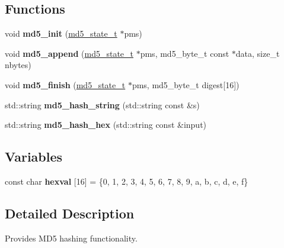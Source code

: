 \subsection*{Functions}
\begin{DoxyCompactItemize}
\item 
void {\bfseries md5\+\_\+init} (\hyperlink{structwebsocketpp_1_1md5_1_1md5__state__s}{md5\+\_\+state\+\_\+t} $\ast$pms)\hypertarget{namespacewebsocketpp_1_1md5_a73499ae9912f813cdbb98d27b6487112}{}\label{namespacewebsocketpp_1_1md5_a73499ae9912f813cdbb98d27b6487112}

\item 
void {\bfseries md5\+\_\+append} (\hyperlink{structwebsocketpp_1_1md5_1_1md5__state__s}{md5\+\_\+state\+\_\+t} $\ast$pms, md5\+\_\+byte\+\_\+t const $\ast$data, size\+\_\+t nbytes)\hypertarget{namespacewebsocketpp_1_1md5_afd827a71255e45a8293b9df13342ceb3}{}\label{namespacewebsocketpp_1_1md5_afd827a71255e45a8293b9df13342ceb3}

\item 
void {\bfseries md5\+\_\+finish} (\hyperlink{structwebsocketpp_1_1md5_1_1md5__state__s}{md5\+\_\+state\+\_\+t} $\ast$pms, md5\+\_\+byte\+\_\+t digest\mbox{[}16\mbox{]})\hypertarget{namespacewebsocketpp_1_1md5_a29e7adb892ae2de7d2c4853bc7ace034}{}\label{namespacewebsocketpp_1_1md5_a29e7adb892ae2de7d2c4853bc7ace034}

\item 
std\+::string {\bfseries md5\+\_\+hash\+\_\+string} (std\+::string const \&s)\hypertarget{namespacewebsocketpp_1_1md5_ab445cdc2367665afb8fd4e983a354e0f}{}\label{namespacewebsocketpp_1_1md5_ab445cdc2367665afb8fd4e983a354e0f}

\item 
std\+::string {\bfseries md5\+\_\+hash\+\_\+hex} (std\+::string const \&input)\hypertarget{namespacewebsocketpp_1_1md5_a9fbd05134b509739ff15175fe7104443}{}\label{namespacewebsocketpp_1_1md5_a9fbd05134b509739ff15175fe7104443}

\end{DoxyCompactItemize}
\subsection*{Variables}
\begin{DoxyCompactItemize}
\item 
const char {\bfseries hexval} \mbox{[}16\mbox{]} = \{\textquotesingle{}0\textquotesingle{}, \textquotesingle{}1\textquotesingle{}, \textquotesingle{}2\textquotesingle{}, \textquotesingle{}3\textquotesingle{}, \textquotesingle{}4\textquotesingle{}, \textquotesingle{}5\textquotesingle{}, \textquotesingle{}6\textquotesingle{}, \textquotesingle{}7\textquotesingle{}, \textquotesingle{}8\textquotesingle{}, \textquotesingle{}9\textquotesingle{}, \textquotesingle{}a\textquotesingle{}, \textquotesingle{}b\textquotesingle{}, \textquotesingle{}c\textquotesingle{}, \textquotesingle{}d\textquotesingle{}, \textquotesingle{}e\textquotesingle{}, \textquotesingle{}f\textquotesingle{}\}\hypertarget{namespacewebsocketpp_1_1md5_a6c9cff96cd43c87cb0fc47f7d641dac8}{}\label{namespacewebsocketpp_1_1md5_a6c9cff96cd43c87cb0fc47f7d641dac8}

\end{DoxyCompactItemize}


\subsection{Detailed Description}
Provides M\+D5 hashing functionality. 